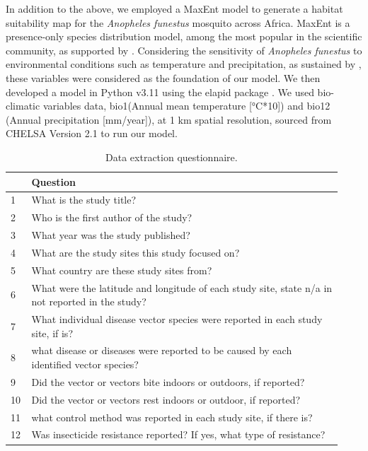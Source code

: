 \documentclass{article}
\begin{document}
In addition to the above, we employed a MaxEnt model to generate a habitat suitability map for the \textit{Anopheles funestus} mosquito across Africa. 
MaxEnt is a presence-only species distribution model, among the most popular in the scientific community, as supported by \citep{2021.SA.SDM}. 
Considering the sensitivity of \textit{Anopheles funestus} to environmental conditions such as temperature and precipitation, as sustained by 
\citep{2016.NC.AGB, 2012.ME.AGM}, these variables were considered as the foundation of our model. 
We then developed a model in Python v3.11 using the elapid package \citep{2023.CB.ESD}. We used bio-climatic variables data, bio1(Annual mean temperature [°C*10]) 
and bio12 (Annual precipitation [mm/year]), at 1 km spatial resolution, sourced from CHELSA Version 2.1 \citep{2017.DN.CAH} to run our model.

\begin{table}[ht]
\centering
\caption{Data extraction questionnaire.}\label{tab:questionnaire}
\begin{tabular}{p{0.05\linewidth}|p{0.88\linewidth}}
\toprule
&\textbf{Question} \\ 
\midrule
1 & What is the study title? \\
\midrule 
2 & Who is the first author of the study? \\
\midrule
3 & What year was the study published? \\
\midrule
4 & What are the study sites this study focused on? \\
\midrule 
5 & What country are these study sites from? \\
\midrule 
6 & What were the latitude and longitude of each study site, state n/a in not reported in the study? \\
\midrule 
7 & What individual disease vector species were reported in each study site, if is? \\
\midrule
8 & what disease or diseases were reported to be caused by each identified vector species? \\
\midrule
9 & Did the vector or vectors bite indoors or outdoors, if reported? \\
\midrule 
10 & Did the vector or vectors rest indoors or outdoor, if reported? \\
\midrule
11 & what control method was reported in each study site, if there is? \\
\midrule
12 & Was insecticide resistance reported? If yes, what type of resistance? \\
\bottomrule
\end{tabular}
\end{table}
\end{document}
